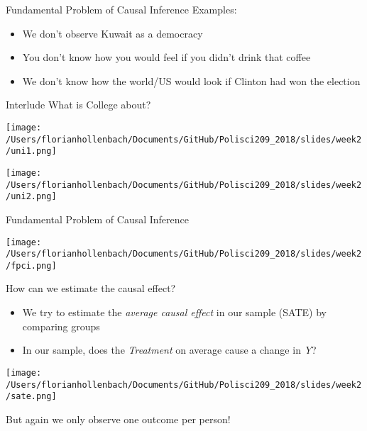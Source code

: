 \documentclass[presentation]{beamer}
\begin{document}
\begin{frame}[label={sec:orga730eb6}]{Fundamental Problem of Causal Inference}
Examples:

\begin{itemize}
\item We don't observe Kuwait as a democracy
\item You don't know how you would feel if you didn't drink that coffee
\item We don't know how the world/US would look if Clinton had won the election
\end{itemize}
\end{frame}



\begin{frame}[label={sec:org7b62b5f}]{Interlude}
\Large{What is College about?}

\pause
\begin{center}
\texttt{[image: /Users/florianhollenbach/Documents/GitHub/Polisci209\_2018/slides/week2/uni1.png]}
\end{center}

\begin{center}
\texttt{[image: /Users/florianhollenbach/Documents/GitHub/Polisci209\_2018/slides/week2/uni2.png]}
\end{center}
\end{frame}


\begin{frame}[label={sec:org9601c6b}]{Fundamental Problem of Causal Inference}
\begin{center}
\texttt{[image: /Users/florianhollenbach/Documents/GitHub/Polisci209\_2018/slides/week2/fpci.png]}
\end{center}
\end{frame}


\begin{frame}[label={sec:orgbaedf58}]{How can we estimate the causal effect?}
\begin{itemize}
\item We try to estimate the \emph{average causal effect} in our sample (SATE) by comparing groups
\item In our sample, does the \emph{Treatment} on average cause a change in \emph{Y}?
\end{itemize}
\pause
\begin{center}
\texttt{[image: /Users/florianhollenbach/Documents/GitHub/Polisci209\_2018/slides/week2/sate.png]}
\end{center}
But again we only observe one outcome per person!
\end{frame}
\end{document}
